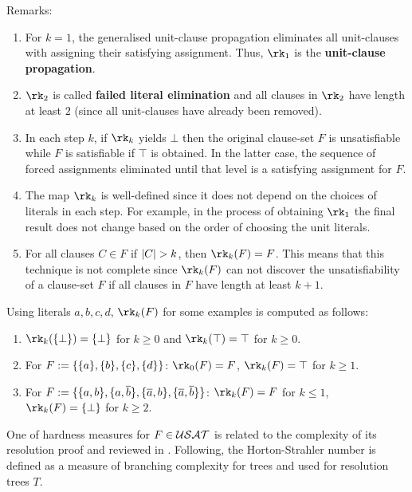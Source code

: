 \documentclass{report}
\begin{document}
Remarks:
\begin{enumerate}
  \item For $k=1$, the generalised unit-clause propagation eliminates all unit-clauses with assigning their satisfying assignment. Thus, $\rk_1$ is the \textbf{unit-clause propagation}.
  \item $\rk_2$ is called \textbf{failed literal elimination} and all clauses in $\rk_2$ have length at least $2$ (since all unit-clauses have already been removed).
  \item In each step $k$, if $\rk_k$ yields $\bot$ then the original clause-set $F$ is unsatisfiable while $F$ is satisfiable if $\top$ is obtained. In the latter case, the sequence of forced assignments eliminated until that level is a satisfying assignment for $F$.
  \item The map $\rk_k$ is well-defined since it does not depend on the choices of literals in each step. For example, in the process of obtaining  $\rk_1$ the final result does not change based on the order of choosing the unit literals. 
  \item For all clauses $C \in F$ if $\lvert C \rvert > k$, then $\rk_k(F) = F$. This means that this technique is not complete since $\rk_k(F)$ can not discover the unsatisfiability of a clause-set $F$ if all clauses in $F$ have length at least $k+1$.
\end{enumerate}

\begin{examp}\label{exp:rk}
Using literals $a,b,c,d$, $\rk_k(F)$ for some examples is computed as follows:
  \begin{enumerate}
  \item $\rk_k(\set{\bot}) = \set{\bot}$ for $k \ge 0$ and $\rk_k(\top) = \top$ for $k \ge 0$.
  \item For $F := \{ \{ a \},\{ b \},\{ c \},\{ d \} \}$: $\rk_0(F) = F$, $\rk_k(F) = \top$ for $k \ge 1$.
  \item For $F := \{ \{ a,b \},\{ a,\overline{b} \}, \{ \overline{a},b \},\{ \overline{a},\overline{b} \} \}$: $\rk_k(F) = F$ for $k \le 1$, $\rk_k(F) = \set{\bot}$ for $k \ge 2$.
  \end{enumerate}
\end{examp}

One of hardness measures for $F \in \mathcal{USAT}$ is related to the complexity of its resolution proof and reviewed in \cite{GwynneKullmann2013GoodRepresentationsIIex, BeyersdorffKullmann2014PHP,BeyersdorffGwynneKullmann2013PHPER,GwynneKullmann2012Slur}. Following, the Horton-Strahler number is defined as a measure of branching complexity for trees and used for resolution trees $T$.
\end{document}
